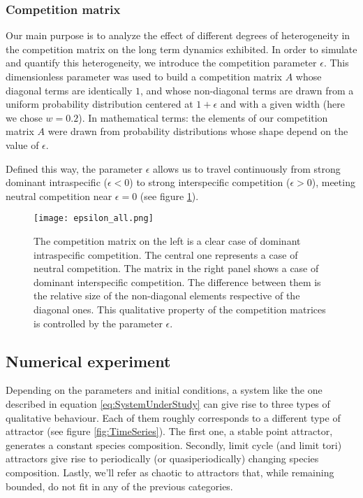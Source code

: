 \subsubsection{Competition matrix}
\label{subsubsec:CompetitionParameter}

Our main purpose is to analyze the effect of different degrees of heterogeneity in the competition matrix on the long term dynamics exhibited. In order to simulate and quantify this heterogeneity, we introduce the competition parameter $ \epsilon $. This dimensionless parameter was used to build a competition matrix $A$ whose diagonal terms are identically $ 1 $, and whose non-diagonal terms are drawn from a uniform probability distribution centered at $ 1 + \epsilon $ and with a given width (here we chose $ w = 0.2$). In mathematical terms: the elements of our competition matrix $A$ were drawn from probability distributions whose shape depend on the value of $\epsilon$.

Defined this way, the parameter $\epsilon$ allows us to travel continuously from strong dominant intraspecific ($ \epsilon < 0$) to strong interspecific competition ($ \epsilon > 0$), meeting neutral competition near $\epsilon = 0$ (see figure \ref{fig:CompetitionParameter}).

\begin{figure}[H]
	\begin{center}
		\texttt{[image: epsilon\_all.png]}
	\end{center}
	\caption{The competition matrix on the left is a clear case of dominant intraspecific competition. The central one represents a case of neutral competition. The matrix in the right panel shows a case of dominant interspecific competition. The difference between them is the relative size of the non-diagonal elements respective of the diagonal ones. This qualitative property of the competition matrices is controlled by the parameter $\epsilon$.}	
	\label{fig:CompetitionParameter}
\end{figure}

\subsection{Numerical experiment}
\label{subsec:NumericalExperiment}

Depending on the parameters and initial conditions, a system like the one described in equation \ref{eq:SystemUnderStudy} can give rise to three types of qualitative behaviour. Each of them roughly corresponds to a different type of attractor (see figure \ref{fig:TimeSeries}). The first one, a stable point attractor, generates a constant species composition. Secondly, limit cycle (and limit tori) attractors give rise to periodically (or quasiperiodically) changing species composition. Lastly, we'll refer as chaotic to attractors that, while remaining bounded, do not fit in any of the previous categories.

